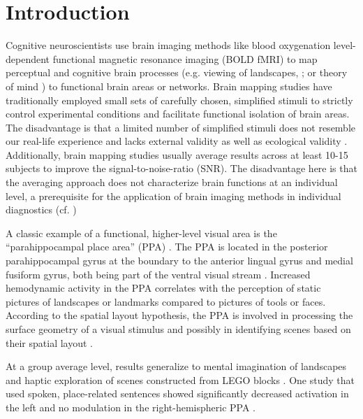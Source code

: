 \documentclass[english]{article}
\begin{document}
\section{Introduction} Cognitive neuroscientists use brain imaging methods like
blood oxygenation level-dependent functional magnetic resonance imaging (BOLD
fMRI) to map perceptual and cognitive brain processes (e.g. viewing of
landscapes, \citep{epstein1998ppa}; or theory of mind
\citep{spunt2014validating}) to functional brain areas or networks. Brain
mapping studies have traditionally employed small sets of carefully chosen,
simplified stimuli to strictly control experimental conditions and facilitate
functional isolation of brain areas. The disadvantage is that a limited number
of simplified stimuli does not resemble our real-life experience and lacks
external validity \citep{westfall2016fixing} as well as ecological validity
\citep{hasson2004intersubject}. Additionally, brain mapping studies usually
average results across at least 10-15 subjects to improve the
signal-to-noise-ratio (SNR). The disadvantage here is that the averaging
approach does not characterize brain functions at an individual level, a
prerequisite for the application of brain imaging methods in individual
diagnostics (cf. \citep{dubois2016building, eickhoff2020towards})


A classic example of a functional, higher-level visual area is the
``parahippocampal place area'' (PPA) \citep{epstein1998ppa,
epstein1999parahippocampal}. The PPA is located in the posterior parahippocampal
gyrus at the boundary to the anterior lingual gyrus and medial fusiform gyrus,
both being part of the ventral visual stream \citep{mishkin1982contribution,
goodale1992separate}. Increased hemodynamic activity in the PPA correlates with
the perception of static pictures of landscapes or landmarks compared to
pictures of tools or faces.  According to the spatial layout hypothesis, the PPA
is involved in processing the surface geometry of a visual stimulus and possibly
in identifying scenes based on their spatial layout \citep{epstein2010reliable}.

At a group average level, results generalize to mental imagination of landscapes
\citep{ocraven2000mental} and haptic exploration of scenes constructed from LEGO
blocks \citep{wolbers2011modality}. One study that used spoken, place-related
sentences showed significantly decreased activation in the left and no
modulation in the right-hemispheric PPA \citep{aziz2008modulation}.
\end{document}
